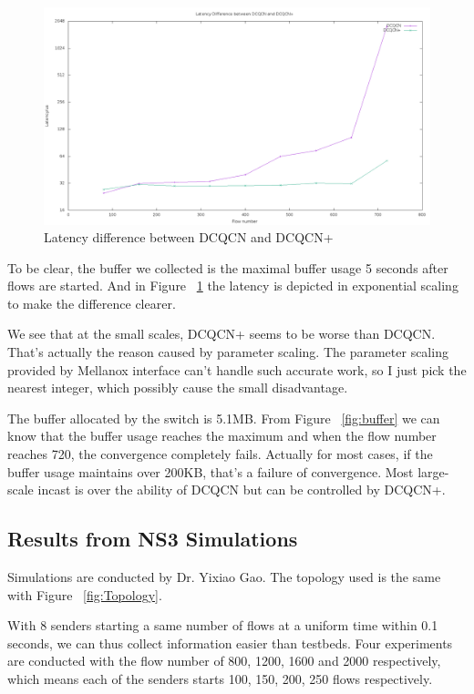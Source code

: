 \documentclass[12pt,a4paper]{article}
\begin{document}
\begin{figure}[h!]
	\begin{center}
		\includegraphics[width=6in]{latency}
		\caption{Latency difference between DCQCN and DCQCN+}
		\label{fig:latency}
	\end{center}
\end{figure}

To be clear, the buffer we collected is the maximal buffer usage 5 seconds after flows are started.
And in Figure ~\ref{fig:latency} the latency is depicted in exponential scaling to make the difference clearer.

We see that at the small scales, DCQCN+ seems to be worse than DCQCN.
That's actually the reason caused by parameter scaling.
The parameter scaling provided by Mellanox interface can't handle such accurate work, so I just pick the nearest integer,
which possibly cause the small disadvantage.

The buffer allocated by the switch is 5.1MB.
From Figure ~\ref{fig:buffer} we can know that the buffer usage reaches the maximum
and when the flow number reaches 720,
the convergence completely fails.
Actually for most cases, if the buffer usage maintains over 200KB, that's a failure of convergence.
Most large-scale incast is over the ability of DCQCN but can be controlled by DCQCN+.

\subsection{Results from NS3 Simulations}

Simulations are conducted by Dr. Yixiao Gao. The topology used is the same with Figure ~\ref{fig:Topology}.

With 8 senders starting a same number of flows at a uniform time within 0.1 seconds,
we can thus collect information easier than testbeds.
Four experiments are conducted with the flow number of 800, 1200, 1600 and 2000 respectively,
which means each of the senders starts 100, 150, 200, 250 flows respectively.
\end{document}
